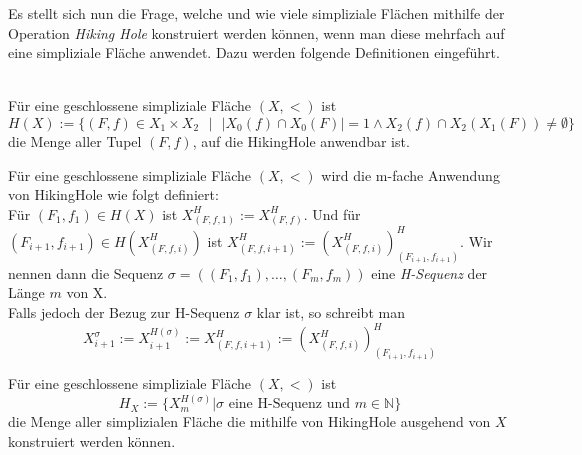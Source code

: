 \documentclass[12pt,titlepage]{article}
\begin{document}
Es stellt sich nun die Frage, welche und wie viele simpliziale Flächen mithilfe der Operation \emph{Hiking Hole} konstruiert werden können, wenn man diese mehrfach auf eine simpliziale Fläche anwendet. Dazu werden folgende Definitionen eingeführt.\\\\
\begin{definition}
Für eine geschlossene simpliziale Fläche $(X,<)$ ist 
\[
H(X):=\{(F,f)\in X_{1}\times X_{2} \text{ }\vert \text{ }\vert X_{0}(f) \cap X_{0}(F)\vert = 1 \land X_2(f) \cap X_2(X_1(F))\neq \emptyset\}
\]
die Menge aller Tupel $(F,f)$, auf die HikingHole anwendbar ist.
\end{definition}

\begin{definition}
Für eine geschlossene simpliziale Fläche $(X,<)$ wird die m-fache Anwendung von HikingHole wie folgt definiert:\\
Für $(F_{1},f_{1})\in H(X) $ ist $X^{H}_{(F,f,1)}:=X^{H}_{(F,f)}$. Und für $(F_{i+1},f_{i+1}) \in H(X^{H}_{(F,f,i)})$ ist $X^{H}_{(F,f,i+1)}:=(X^{H}_{(F,f,i)})^{H}_{(F_{i+1},f_{i+1})}$. Wir nennen dann die Sequenz $\sigma=((F_{1},f_{1}),\ldots,(F_{m},f_{m}))$
eine \emph{H-Sequenz} der Länge $m$ von X.\\
Falls jedoch der Bezug zur H-Sequenz $\sigma$ klar ist, so schreibt man 
\[
X^{\sigma}_{i+1}:=X^{H(\sigma)}_{i+1}:=X^{H}_{(F,f,i+1)}:=(X^{H}_{(F,f,i)})^{H}_{(F_{i+1},f_{i+1})}
\]

\end{definition}

\begin{definition}
Für eine geschlossene simpliziale Fläche $(X,<)$ ist 
\[
H_{X}:=\{X^{H(\sigma)}_{m}\vert \sigma \text{ eine H-Sequenz und } m\in \mathbb{N}\}
\]
die Menge aller simplizialen Fläche die mithilfe von HikingHole ausgehend von $X$ konstruiert werden können.
\end{definition}


%
\end{document}
